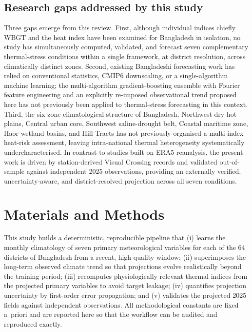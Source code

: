 \documentclass[pdflatex,sn-basic,lineno]{sn-jnl}
\begin{document}
\subsection{Research gaps addressed by this study}
Three gaps emerge from this review. First, although individual indices chiefly
WBGT and the heat index have been examined for Bangladesh in isolation, no study
has simultaneously computed, validated, and forecast seven complementary
thermal-stress conditions within a single framework, at district resolution, across
climatically distinct zones. Second, existing Bangladeshi forecasting work has
relied on conventional statistics, CMIP6 downscaling, or a single-algorithm machine
learning; the multi-algorithm gradient-boosting ensemble with Fourier feature
engineering and an explicitly re-imposed observational trend proposed here has not
previously been applied to thermal-stress forecasting in this context. Third, the
six-zone climatological structure of Bangladesh, Northwest dry-hot plains, Central
urban core, Southwest saline-drought belt, Coastal maritime zone, Haor wetland
basins, and Hill Tracts has not previously organised a multi-index heat-risk
assessment, leaving intra-national thermal heterogeneity systematically
undercharacterised. In contrast to studies built on ERA5 reanalysis, the present
work is driven by station-derived Visual Crossing records and validated
out-of-sample against independent 2025 observations, providing an externally
verified, uncertainty-aware, and district-resolved projection across all seven
conditions.


\section{Materials and Methods}\label{sec:methods}

This study builds a deterministic, reproducible pipeline that (i) learns the
monthly climatology of seven primary meteorological variables for each of the
64 districts of Bangladesh from a recent, high-quality window; (ii) superimposes
the long-term observed climate trend so that projections evolve realistically
beyond the training period; (iii) recomputes physiologically relevant thermal
indices from the projected primary variables to avoid target leakage; (iv)
quantifies projection uncertainty by first-order error propagation; and (v)
validates the projected 2025 fields against independent observations. All
methodological constants are fixed a~priori and are reported here so that the
workflow can be audited and reproduced exactly.
\end{document}
